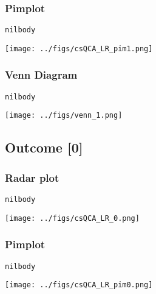 \documentclass[11pt]{article}
\begin{document}
\subsubsection{Pimplot}
\label{sec:orge2343a8}
\begin{verbatim}
nilbody
\end{verbatim}

\begin{center}
\texttt{[image: ../figs/csQCA\_LR\_pim1.png]}
\end{center}
\subsubsection{Venn Diagram}
\label{sec:org9f74bcf}
\begin{verbatim}
nilbody
\end{verbatim}

\begin{center}
\texttt{[image: ../figs/venn\_1.png]}
\end{center}

\subsection{Outcome [0]}
\label{sec:org6daa33b}
\subsubsection{Radar plot}
\label{sec:org4a41c7d}
\begin{verbatim}
nilbody
\end{verbatim}

\begin{center}
\texttt{[image: ../figs/csQCA\_LR\_0.png]}
\end{center}

\subsubsection{Pimplot}
\label{sec:org0830fc3}
\begin{verbatim}
nilbody
\end{verbatim}

\begin{center}
\texttt{[image: ../figs/csQCA\_LR\_pim0.png]}
\end{center}
\end{document}
